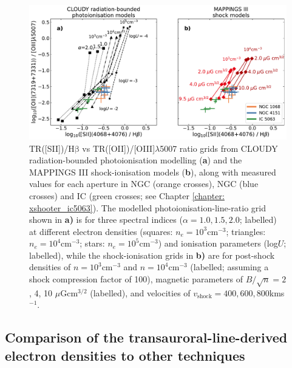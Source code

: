 \begin{figure}[!t]
    \centering
    \includegraphics[width=\linewidth]{figures/stis_seyferts/tr_oiii_hbeta.pdf}
    \caption[TR({[}SII{]})/H$\mathrm{\beta}$ vs TR({[}OII{]})/{[}OIII{]}$\lambda$5007 diagnostic diagram for the warm ionised gas in IC, NGC, and NGC, along with grids produced from photo- and shock-ionisation modelling.]{TR([SII])/H$\mathrm{\beta}$ vs TR([OII])/[OIII]$\lambda$5007 ratio grids from \textsc{CLOUDY} radiation-bounded photoionisation modelling (\textbf{a}) and the \citet{Allen2008} MAPPINGS III shock-ionisation models (\textbf{b}), along with measured values for each aperture in NGC (orange crosses), NGC (blue crosses) and IC (green crosses; see Chapter \ref{chapter: xshooter_ic5063}). The modelled photoionisation-line-ratio grid shown in \textbf{a)} is for three spectral indices ($\alpha=1.0, 1.5, 2.0$; labelled) at different electron densities (squares: $n_e=10^3$\;cm$^{-3}$; triangles: $n_e=10^4$\;cm$^{-3}$; stars: $n_e=10^5$\;cm$^{-3}$) and ionisation parameters (log\;$U$; labelled), while the shock-ionisation grids in \textbf{b)} are for post-shock densities of $n=10^3$\;cm$^{-3}$ and $n=10^{4}$\;cm$^{-3}$ (labelled; assuming a shock compression factor of 100), magnetic parameters of $B/\sqrt{n}=2$, 4, 10 \;$\mu$G\;cm$^{3/2}$ (labelled), and velocities of $v_\mathrm{shock}=400, 600, 800$\;km\;s$^{-1}$.}
    \label{fig: stis_seyferts: tr_oiii_hbeta}
\end{figure}

\subsection{Comparison of the transauroral-line-derived electron densities to other techniques}
\label{section: stis_seyferts: disc-density-tr}

